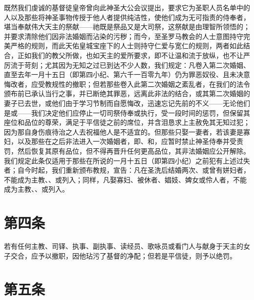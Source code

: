 既然我们虔诚的基督徒皇帝曾向此神圣大公会议提出，要求它为圣职人员名单中的人以及那些将神圣事物传授于他人者提供纯洁性，使他们成为无可指责的侍奉者，堪当奉献伟大天主的祭献——祂既是祭品又是大司祭，这祭献是由理智所领悟的；并要求清除他们因非法婚姻而沾染的污秽；而今，至圣罗马教会的人士意图持守完美严格的规则，而此天佑皇城宝座下的人士则持守仁爱与宽仁的规则，两者如此结合，正如我们的教父所做，也如天主的爱所要求，即不让温和流于放纵，也不让严厉流于苛刻；尤其因为无知之过已到达不少人数，我们规定：凡卷入第二次婚姻、直至去年一月十五日（即第四小纪、第六千一百零九年）仍为罪恶奴役、且未决意悔改者，应受教规性的撤职；但若那些卷入此第二次婚姻之紊乱者，在我们的法令颁布前已承认当行之事，并已断绝其罪恶，远离此非法的结合，或其第二次婚姻的妻子已去世，或他们由于学习节制而自愿悔改，迅速忘记先前的不义——无论他们是或——我们决定他们应停止一切司祭侍奉或执行，受一段时间的惩罚，但保留其座位和品位的尊荣，满足于平信徒之前的席位，并含泪恳求上主赦免其无知过犯；因为那自身伤痕待治之人去祝福他人是不适宜的。但那些只娶一妻者，若该妻是寡妇，以及那些在之后非法进入一次婚姻者，即、和，应暂时禁止神圣侍奉并受责罚，然后恢复其原有品位，但不得再晋升任何更高品位，其非法婚姻应公开解除。我们规定此条仅适用于那些在所说的一月十五日（即第四小纪）之前犯有上述过失者；自今时起，我们重新颁布教规，宣告：凡在圣洗后结婚两次、或曾有姘妇者，不能成为主教、、或列入；同样，凡娶寡妇、被休者、娼妓、婢女或伶人者，不能成为主教、、或列入。\par


\section{第四条}

若有任何主教、司铎、执事、副执事、读经员、歌咏员或看门人与献身于天主的女子交合，应予以撤职，因他玷污了基督的净配；但若是平信徒，则予以绝罚。\par


\section{第五条}

